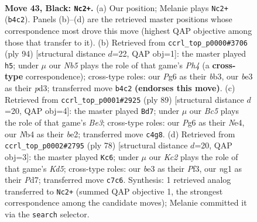 \documentclass[11pt]{article}
\begin{document}
\clearpage

\begin{figure}[p]\centering
\begin{subfigure}{0.46\textwidth}\centering
\resizebox{\linewidth}{!}{%
\newchessgame
\chessboard[
  setfen={8/2k5/3b2p1/6P1/pnb5/4B3/8/4K1N1 b - - 21 43},
  showmover=false,
  pgfstyle=straightmove, color=movearrow, markmove={b4-c2}
]}
\caption{}
\end{subfigure}\hfill
\begin{subfigure}{0.46\textwidth}\centering
\resizebox{\linewidth}{!}{%
\newchessgame
\chessboard[
  setfen={8/5p1k/8/8/5KPP/1b1p4/3B4/8 w - - 1 48},
  showmover=false,
  pgfstyle=straightmove, color=movearrow, markmove={h4-h5}
]}
\caption{}
\end{subfigure}
\\[4pt]
\begin{subfigure}{0.46\textwidth}\centering
\resizebox{\linewidth}{!}{%
\newchessgame
\chessboard[
  setfen={5k2/2N1b3/4b1p1/4B3/4n3/8/4BP2/7K b - - 1 45},
  showmover=false,
  pgfstyle=straightmove, color=movearrow, markmove={e6-d7}
]}
\caption{}
\end{subfigure}\hfill
\begin{subfigure}{0.46\textwidth}\centering
\resizebox{\linewidth}{!}{%
\newchessgame
\chessboard[
  setfen={3b4/3P3p/5k2/3K4/2B2p2/5P2/7P/8 w - - 1 40},
  showmover=false,
  pgfstyle=straightmove, color=movearrow, markmove={d5-c6}
]}
\caption{}
\end{subfigure}
\caption{\textbf{Move 43, Black: \texttt{Nc2+}.} (a) Our position; Melanie plays \texttt{Nc2+} (\texttt{b4c2}). Panels (b)--(d) are the retrieved master positions whose correspondence most drove this move (highest QAP objective among those that transfer to it). (b) Retrieved from \texttt{ccrl\_top\_p0000\#3706} (ply 94) [structural distance $d$=22, QAP obj=1]: the master played \texttt{h5}; under $\mu$ our \emph{Nb5} plays the role of that game's \emph{Ph4} (a \textbf{cross-type} correspondence); cross-type roles: our \emph{P}g6 as their \emph{b}b3, our \emph{b}e3 as their \emph{p}d3; transferred move \texttt{b4c2} \textbf{(endorses this move)}. (c) Retrieved from \texttt{ccrl\_top\_p0001\#2925} (ply 89) [structural distance $d$=20, QAP obj=4]: the master played \texttt{Bd7}; under $\mu$ our \emph{Bc5} plays the role of that game's \emph{Be3}; cross-type roles: our \emph{P}g6 as their \emph{N}e4, our \emph{N}b4 as their \emph{b}e2; transferred move \texttt{c4g8}. (d) Retrieved from \texttt{ccrl\_top\_p0002\#2795} (ply 78) [structural distance $d$=20, QAP obj=3]: the master played \texttt{Kc6}; under $\mu$ our \emph{Kc2} plays the role of that game's \emph{Kd5}; cross-type roles: our \emph{b}e3 as their \emph{P}f3, our \emph{n}g1 as their \emph{P}d7; transferred move \texttt{c7c6}. Synthesis: 1 retrieved analog transferred to \texttt{Nc2+} (summed QAP objective 1, the strongest correspondence among the candidate moves); Melanie committed it via the \texttt{search} selector.}
\label{fig:thought-m85}
\end{figure}
\end{document}
